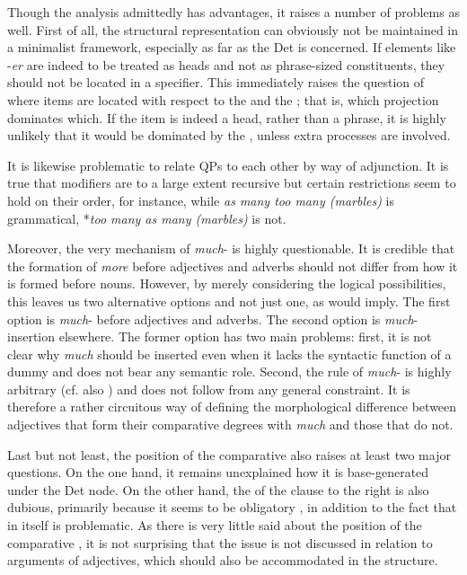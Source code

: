 Though the analysis admittedly has advantages, it raises a number of problems as well. First of all, the structural representation can obviously not be maintained in a minimalist framework, especially as far as the Det is concerned. If elements like -\textit{er} are indeed to be treated as heads and not as phrase-sized constituents, they should not be located in a specifier. This immediately raises the question of where  items are located with respect to the  and the ; that is, which projection dominates which. If the  item is indeed a head, rather than a phrase, it is highly unlikely that it would be dominated by the , unless extra  processes are involved.

It is likewise problematic to relate QPs to each other by way of adjunction. It is true that  modifiers are to a large extent recursive but certain restrictions seem to hold on their order, for instance, while \textit{as many too many (marbles)} is grammatical, *\textit{too many as many (marbles)} is not.

Moreover, the very mechanism of \textit{much}- is highly questionable. It is credible that the formation of \textit{more} before adjectives and adverbs should not differ from how it is formed before nouns. However, by merely considering the logical possibilities, this leaves us two alternative options and not just one, as \citet{bresnan1973} would imply. The first option is \textit{much}- before adjectives and adverbs. The second option is \textit{much}-insertion elsewhere. The former option has two main problems: first, it is not clear why \textit{much} should be inserted even when it lacks the syntactic function of a dummy and does not bear any semantic role. Second, the rule of \textit{much}- is highly arbitrary (cf. also \citealt{corver1997, jackendoff1977, brame1986}) and does not follow from any general constraint. It is therefore a rather circuitous way of defining the morphological difference between adjectives that form their comparative degrees with \textit{much} and those that do not.

Last but not least, the position of the comparative  also raises at least two major questions. On the one hand, it remains unexplained how it is base-generated under the Det node. On the other hand, the  of the clause to the right is also dubious, primarily because it seems to be obligatory , in addition to the fact that  in itself is problematic. As there is very little said about the position of the comparative , it is not surprising that the issue is not discussed in relation to  arguments of adjectives, which should also be accommodated in the structure.

